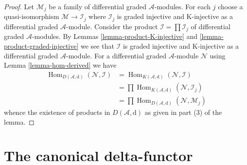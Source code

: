 \documentclass{stacks-project}
\theoremstyle{plain}
\theoremstyle{definition}
\theoremstyle{remark}
\numberwithin{equation}{subsection}
\def\Hom{\mathop{\mathrm{Hom}}\nolimits}
\begin{document}
\begin{proof}
\medskip\noindent
Let $\mathcal{M}_j$ be a family of differential graded $\mathcal{A}$-modules.
For each $j$ choose a quasi-isomorphism
$\mathcal{M} \to \mathcal{I}_j$ where
$\mathcal{I}_j$ is graded injective and K-injective as a
differential graded $\mathcal{A}$-module.
Consider the product $\mathcal{I} = \prod \mathcal{I}_j$
of differential graded $\mathcal{A}$-modules.
By Lemmas \ref{lemma-product-K-injective} and
\ref{lemma-product-graded-injective} we see that
$\mathcal{I}$ is graded injective and K-injective as a
differential graded $\mathcal{A}$-module.
For a differential graded $\mathcal{A}$-module
$\mathcal{N}$ using Lemma \ref{lemma-hom-derived} we have
\begin{align*}
\Hom_{D(\mathcal{A}, \text{d})}(\mathcal{N}, \mathcal{I})
& =
\Hom_{K(\mathcal{A}, \text{d})}(\mathcal{N}, \mathcal{I}) \\
& =
\prod \Hom_{K(\mathcal{A}, \text{d})}(\mathcal{N}, \mathcal{I}_j) \\
& =
\prod \Hom_{D(\mathcal{A}, \text{d})}(\mathcal{N}, \mathcal{M}_j)
\end{align*}
whence the existence of products in $D(\mathcal{A}, \text{d})$ as given in
part (3) of the lemma.
\end{proof}







\section{The canonical delta-functor}
\label{section-canonical-delta-functor}
\end{document}
